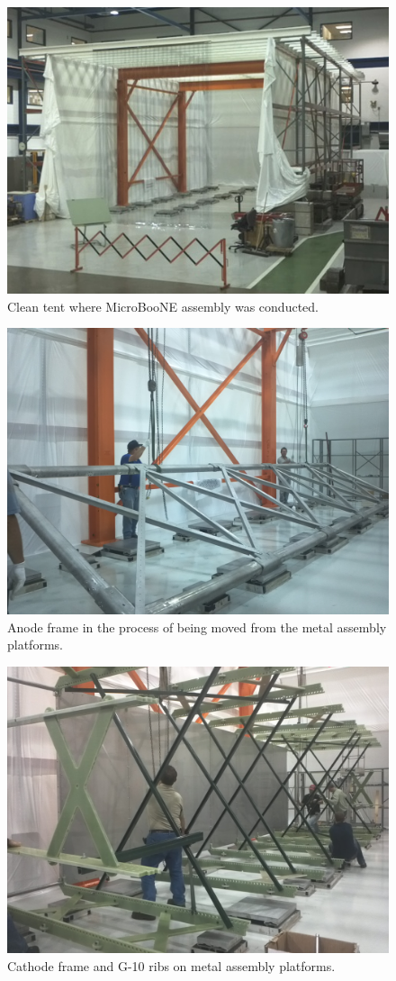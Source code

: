 \begin{figure}[htb]
\centering	
\includegraphics[width=0.8\linewidth]{figures/tent.jpg}
\caption{Clean tent where MicroBooNE \lartpc assembly was conducted.}
\label{fig:tent}
\end{figure}


\begin{figure}[htb]
\centering	
\includegraphics[width=0.8\linewidth]{figures/tpc-anode-frame.jpg}
\caption{Anode frame in the process of being moved from the metal assembly platforms.}
\label{fig:tpc-anode-frame}
\end{figure}

\begin{figure}[htb]
\centering	
\includegraphics[width=0.8\linewidth]{figures/tpc-cathode-g10-frame.jpg}
\caption{Cathode frame and G-10 ribs on metal assembly platforms.}
\label{fig:tpc-cathode-g10-frame}
\end{figure}



